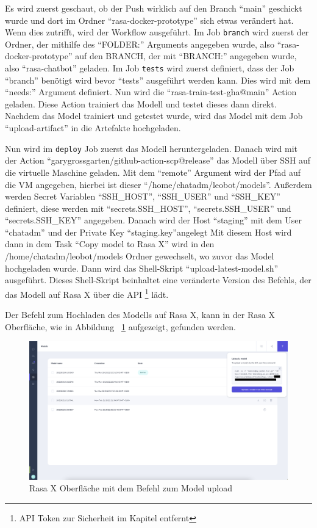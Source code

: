 Es wird zuerst geschaut, ob der Push wirklich auf den Branch ``main'' geschickt wurde und dort im Ordner ``rasa-docker-prototype'' sich etwas verändert hat.
Wenn dies zutrifft, wird der Workflow ausgeführt.
Im Job \texttt{branch} wird zuerst der Ordner, der mithilfe des ``FOLDER:'' Arguments angegeben wurde, also ``rasa-docker-prototype'' auf den BRANCH, der mit ``BRANCH:'' angegeben wurde, also ``rasa-chatbot'' geladen.
Im Job \texttt{tests} wird zuerst definiert, dass der Job ``branch'' benötigt wird bevor ``tests'' ausgeführt werden kann.
Dies wird mit dem ``needs:'' Argument definiert.
Nun wird die ``rasa-train-test-gha@main'' Action geladen.
Diese Action trainiert das Modell und testet dieses dann direkt.
Nachdem das Model trainiert und getestet wurde, wird das Model mit dem Job ``upload-artifact'' in die Artefakte hochgeladen.

Nun wird im \texttt{deploy} Job zuerst das Modell heruntergeladen.
Danach wird mit der Action ``garygrossgarten/github-action-scp@release'' das Modell über SSH auf die virtuelle Maschine geladen.
Mit dem ``remote'' Argument wird der Pfad auf die VM angegeben, hierbei ist dieser ``/home/chatadm/leobot/models''.
Außerdem werden Secret Variablen ``SSH\_HOST'', ``SSH\_USER'' und ``SSH\_KEY'' definiert, diese werden mit ``secrets.SSH\_HOST'', ``secrets.SSH\_USER'' und ``secrets.SSH\_KEY'' angegeben.
Danach wird der Host ``staging'' mit dem User ``chatadm'' und der Private Key ``staging.key''angelegt
Mit diesem Host wird dann in dem Task ``Copy model to Rasa X'' wird in den /home/chatadm/leobot/models Ordner gewechselt, wo zuvor das Model hochgeladen wurde.
Dann wird das Shell-Skript ``upload-latest-model.sh'' ausgeführt.
Dieses Shell-Skript beinhaltet eine veränderte Version des Befehls, der das Modell auf Rasa X über die API \footnote{API Token zur Sicherheit im Kapitel entfernt} lädt.

Der Befehl zum Hochladen des Modells auf Rasa X, kann in der Rasa X Oberfläche, wie in Abbildung ~\ref{fig:impl:rasaxapimodel} aufgezeigt, gefunden werden.

\begin{figure}[hbt!]
    \centering
    \includegraphics[scale=0.2]{pics/rasaxapimodel}
    \caption{Rasa X Oberfläche mit dem Befehl zum Model upload}
    \label{fig:impl:rasaxapimodel}
\end{figure}

